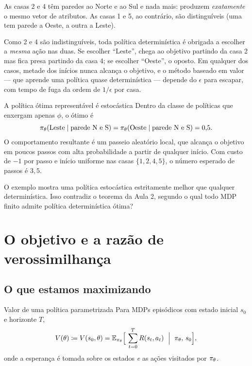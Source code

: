 \documentclass[11pt]{article}
\newcommand{\thv}{\theta}
\newcommand{\polth}{\pol_{\thv}}
\newcommand{\feat}{\phi}
\begin{document}
As casas 2 e 4 têm paredes ao Norte e ao Sul e nada mais: produzem
\emph{exatamente} o mesmo vetor de atributos. As casas 1 e 5, ao contrário, são
distinguíveis (uma tem parede a Oeste, a outra a Leste).

\begin{alertabox}
Como 2 e 4 são indistinguíveis, toda política determinística é obrigada a
escolher a \emph{mesma} ação nas duas. Se escolher ``Leste'', chega ao objetivo
partindo da casa 2 mas fica presa partindo da casa 4; se escolher ``Oeste'',
o oposto. Em qualquer dos casos, metade dos inícios nunca alcança o objetivo,
e o método baseado em valor --- que aprende uma política quase determinística
--- depende do $\epsilon$ para escapar, com tempo de fuga da ordem de
$1/\epsilon$ por casa.
\end{alertabox}

\begin{teobox}{A política ótima representável é estocástica}
Dentro da classe de políticas que enxergam apenas $\feat$, o ótimo é
\[
  \polth(\text{Leste}\mid\text{parede N e S}) =
  \polth(\text{Oeste}\mid\text{parede N e S}) = 0{,}5 .
\]
O comportamento resultante é um passeio aleatório local, que alcança o objetivo
em poucos passos com alta probabilidade a partir de qualquer início. Com custo
de $-1$ por passo e início uniforme nas casas $\{1,2,4,5\}$, o número esperado de
passos é $3{,}5$.
\end{teobox}

\begin{discbox}
O exemplo mostra uma política estocástica estritamente melhor que qualquer
determinística. Isso contradiz o teorema da Aula 2, segundo o qual todo MDP
finito admite política determinística ótima?
\end{discbox}

\section{O objetivo e a razão de verossimilhança}

\subsection{O que estamos maximizando}

\begin{defbox}{Valor de uma política parametrizada}
Para MDPs episódicos com estado inicial $s_0$ e horizonte $T$,
\[
  V(\thv) \defeq V(s_0,\thv)
  = \E_{\polth}\Bigl[\ \sum_{t=0}^{T} \rec(s_t,a_t)\ \Bigm|\ \polth,\, s_0\Bigr],
\]
onde a esperança é tomada sobre os estados \emph{e} as ações visitados por
$\polth$.
\end{defbox}
\end{document}
